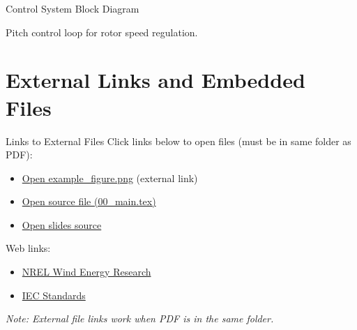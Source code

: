 \begin{frame}{Control System Block Diagram}
    \centering

    \vspace{0.5cm}
    {\small Pitch control loop for rotor speed regulation.}
\end{frame}

\section{External Links and Embedded Files}

\begin{frame}{Links to External Files}
    Click links below to open files (must be in same folder as PDF):

    \vspace{0.5cm}

    \begin{itemize}
        \item \href{run:example_figure.png}{Open example\_figure.png} (external link)
        \item \href{run:00_main.tex}{Open source file (00\_main.tex)}
        \item \href{run:01_slides.tex}{Open slides source}
    \end{itemize}

    \vspace{0.5cm}

    Web links:
    \begin{itemize}
        \item \href{https://www.nrel.gov/wind/}{NREL Wind Energy Research}
        \item \href{https://www.iec.ch}{IEC Standards}
    \end{itemize}

    \vspace{0.3cm}
    {\small\textit{Note: External file links work when PDF is in the same folder.}}
\end{frame}

